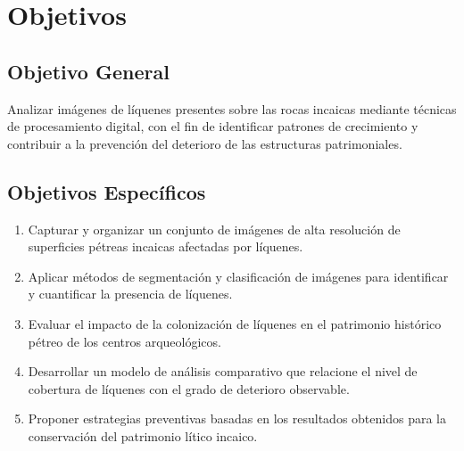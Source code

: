 \chapter{Objetivos}

\section{Objetivo General}
Analizar imágenes de líquenes presentes sobre las rocas incaicas mediante técnicas de procesamiento digital, con el fin de identificar patrones de crecimiento y contribuir a la prevención del deterioro de las estructuras patrimoniales.

\section{Objetivos Específicos}
\begin{enumerate}
    \item Capturar y organizar un conjunto de imágenes de alta resolución de superficies pétreas incaicas afectadas por líquenes.
    \item Aplicar métodos de segmentación y clasificación de imágenes para identificar y cuantificar la presencia de líquenes.
    \item Evaluar el impacto de la colonización de líquenes en el patrimonio histórico pétreo de los centros arqueológicos.
    \item Desarrollar un modelo de análisis comparativo que relacione el nivel de cobertura de líquenes con el grado de deterioro observable.
    \item Proponer estrategias preventivas basadas en los resultados obtenidos para la conservación del patrimonio lítico incaico.
\end{enumerate}